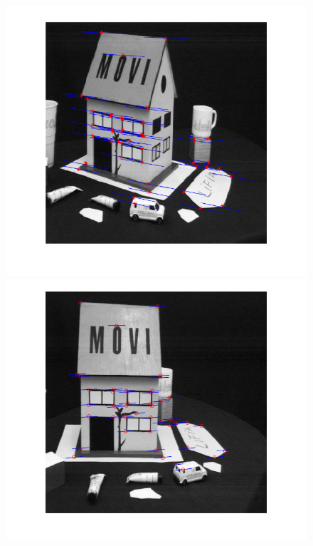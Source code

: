 \documentclass[letterpaper]{article}
\begin{document}
\begin{figure}[H]
	\centering
	\includegraphics[scale=0.4]{r3.png}\includegraphics[scale=0.4]{r4.png}
\end{figure}
\end{document}
